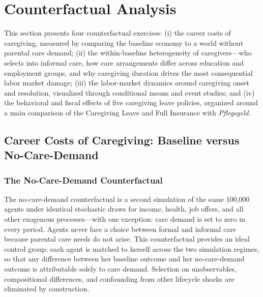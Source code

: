 
\section{Counterfactual Analysis}
\label{sec:counterfactuals}

This section presents four counterfactual exercises: (i) the career costs of caregiving, measured by comparing the baseline economy to a world without parental care demand; (ii) the within-baseline heterogeneity of caregivers---who selects into informal care, how care arrangements differ across education and employment groups, and why caregiving duration drives the most consequential labor market damage; (iii) the labor-market dynamics around caregiving onset and resolution, visualized through conditional means and event studies; and (iv) the behavioral and fiscal effects of five caregiving leave policies, organized around a main comparison of the Caregiving Leave and Full Insurance with \textit{Pflegegeld}.

\subsection{Career Costs of Caregiving: Baseline versus No-Care-Demand}
\label{subsec:career_costs_methodology}

\subsubsection{The No-Care-Demand Counterfactual}

The no-care-demand counterfactual is a second simulation of the same 100,000 agents under identical stochastic draws for income, health, job offers, and all other exogenous processes---with one exception: care demand is set to zero in every period. Agents never face a choice between formal and informal care because parental care needs do not arise. This counterfactual provides an ideal control group: each agent is matched to herself across the two simulation regimes, so that any difference between her baseline outcome and her no-care-demand outcome is attributable solely to care demand. Selection on unobservables, compositional differences, and confounding from other lifecycle shocks are eliminated by construction.

